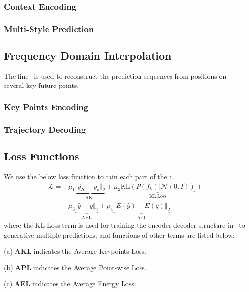 \documentclass[../paper.tex]{subfiles}
\begin{document}
\subsubsection{Context Encoding}

\subsubsection{Multi-Style Prediction}

\subsection{Frequency Domain Interpolation}

The fine \BETAMODEL~is used to reconstruct the prediction sequences from positions on several key future points.

\subsubsection{Key Points Encoding}

\subsubsection{Trajectory Decoding}



\subsection{Loss Functions}

We use the below loss function to tain each part of the \MODEL:
\begin{equation}
    \begin{aligned}
        \mathcal{L} =& \mu_1 \underbrace{\Vert \hat{y}_K - y_k \Vert_2}_{\mbox{AKL}} + \mu_2 \underbrace{\mbox{KL}(P(f_k) \Vert \mathcal{N}(0, I))}_{\mbox{KL Loss}} + \\
        &\mu_3 \underbrace{\Vert \hat{y} - y \Vert_2}_{\mbox{APL}} + \mu_4 \underbrace{\Vert E(\hat{y}) - E(y) \Vert_2}_{\mbox{AEL}},
    \end{aligned}  
\end{equation}
where the KL Loss term is used for training the encoder-decoder structure in \ALPHAMODEL~to generative multiple predictions, and functions of other terms are listed below:

(a) \textbf{AKL} indicates the Average Keypoints Loss.

(b) \textbf{APL} indicates the Average Point-wise Loss.

(c) \textbf{AEL} indicates the Average Energy Loss.
\end{document}
